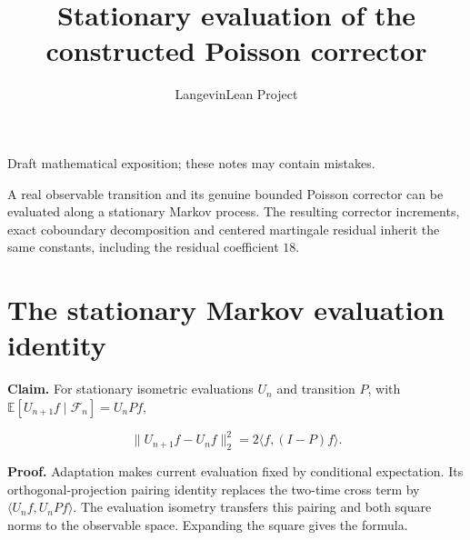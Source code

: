 \documentclass[11pt,a4paper]{article}
\title{\texorpdfstring{Stationary evaluation of the constructed Poisson corrector}{Stationary evaluation of the constructed Poisson corrector}}
\author{LangevinLean Project}
\date{}
\begin{document}
\maketitle
Draft mathematical exposition; these notes may contain mistakes.


A real observable transition and its genuine bounded Poisson corrector can be evaluated along a stationary Markov process. The resulting corrector increments, exact coboundary decomposition and centered martingale residual inherit the same constants, including the residual coefficient \(18\).


\section{\texorpdfstring{The stationary Markov evaluation identity}{The stationary Markov evaluation identity}}


\textbf{Claim.} For stationary isometric evaluations \(U_n\) and transition \(P\), with \(\mathbb E[U_{n+1}f\mid\mathcal F_n]=U_nPf\),

\[\|U_{n+1}f-U_nf\|_2^2=2\langle f,(I-P)f\rangle.\]

\textbf{Proof.} Adaptation makes current evaluation fixed by conditional expectation. Its orthogonal-projection pairing identity replaces the two-time cross term by \(\langle U_nf,U_nPf\rangle\). The evaluation isometry transfers this pairing and both square norms to the observable space. Expanding the square gives the formula.
\end{document}
